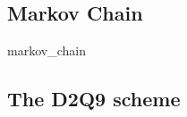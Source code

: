 \documentclass[class=article, crop=false]{standalone}
\begin{document}
\subsection{Markov Chain}\label{chap:MarkovChain}
	{markov_chain}
	

\FloatBarrier
\subsection{The D2Q9 scheme}


\end{document}
